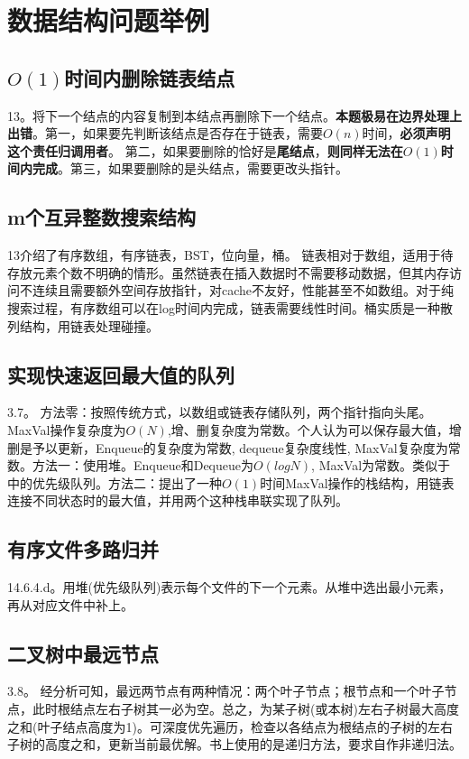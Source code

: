 
\section{数据结构问题举例}

\subsection{$O(1)$时间内删除链表结点}
\cite{sword}13。将下一个结点的内容复制到本结点再删除下一个结点。\textbf{本题极易在边界处理上出错}。第一，如果要先判断该结点是否存在于链表，需要$O(n)$时间，\textbf{必须声明这个责任归调用者}。
第二，如果要删除的恰好是\textbf{尾结点}，\textbf{则同样无法在$O(1)$时间内完成}。第三，如果要删除的是头结点，需要更改头指针。


\subsection{m个互异整数搜索结构}
\cite{pp}13介绍了有序数组，有序链表，BST，位向量，桶。
链表相对于数组，适用于待存放元素个数不明确的情形。虽然链表在插入数据时不需要移动数据，但其内存访问不连续且需要额外空间存放指针，对cache不友好，性能甚至不如数组。对于纯搜索过程，有序数组可以在log时间内完成，链表需要线性时间。桶实质是一种散列结构，用链表处理碰撞。


\subsection{实现快速返回最大值的队列}
\cite{bop}3.7。
方法零：按照传统方式，以数组或链表存储队列，两个指针指向头尾。MaxVal操作复杂度为$O(N)$,增、删复杂度为常数。个人认为可以保存最大值，增删是予以更新，Enqueue的复杂度为常数, dequeue复杂度线性, MaxVal复杂度为常数。方法一：使用堆。Enqueue和Dequeue为$O(logN)$, MaxVal为常数。类似于\cite{ita}中的优先级队列。方法二：\cite{bop}提出了一种$O(1)$时间MaxVal操作的栈结构，用链表连接不同状态时的最大值，并用两个这种栈串联实现了队列。


\subsection{有序文件多路归并}
\cite{pp}14.6.4.d。用堆(优先级队列)表示每个文件的下一个元素。从堆中选出最小元素，再从对应文件中补上。

\subsection{二叉树中最远节点}
\cite{bop}3.8。
经分析可知，最远两节点有两种情况：两个叶子节点；根节点和一个叶子节点，此时根结点左右子树其一必为空。总之，为某子树(或本树)左右子树最大高度之和(叶子结点高度为1)。可深度优先遍历，检查以各结点为根结点的子树的左右子树的高度之和，更新当前最优解。书上使用的是递归方法，要求自作非递归法。



